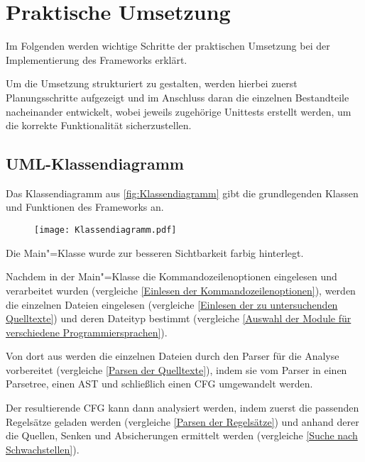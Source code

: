\chapter{Praktische Umsetzung}
    Im Folgenden werden wichtige Schritte der praktischen Umsetzung bei der Implementierung des Frameworks erklärt.

    Um die Umsetzung strukturiert zu gestalten,
    werden hierbei zuerst Planungsschritte aufgezeigt und
    im Anschluss daran die einzelnen Bestandteile nacheinander entwickelt,
    wobei jeweils zugehörige Unittests erstellt werden,
    um die korrekte Funktionalität sicherzustellen.

    \section{UML-Klassendiagramm}
        Das Klassendiagramm aus
        \vref{fig:Klassendiagramm} gibt die grundlegenden Klassen und
        Funktionen des Frameworks an.

        \begin{figure}[htp]
            \centering%
            \texttt{[image: Klassendiagramm.pdf]}
            \label{fig:Klassendiagramm}
        \end{figure}

        Die Main"=Klasse wurde zur besseren Sichtbarkeit farbig hinterlegt.

        Nachdem in der Main"=Klasse die Kommandozeilenoptionen eingelesen und
        verarbeitet wurden
        (vergleiche
        \vref{Einlesen der Kommandozeilenoptionen}),
        werden die einzelnen Dateien eingelesen
        (vergleiche
        \vref{Einlesen der zu untersuchenden Quelltexte}) und
        deren Dateityp bestimmt
        (vergleiche
        \vref{Auswahl der Module für verschiedene Programmiersprachen}).

        Von dort aus werden die einzelnen Dateien durch den Parser für die Analyse vorbereitet
        (vergleiche
        \vref{Parsen der Quelltexte}),
        indem sie vom Parser in einen Parsetree,
        einen
        \gls{AST} und
        schließlich einen
        \gls{CFG} umgewandelt werden.

        Der resultierende
        \gls{CFG} kann dann analysiert werden,
        indem zuerst die passenden Regelsätze geladen werden
        (vergleiche
        \vref{Parsen der Regelsätze}) und
        anhand derer die Quellen,
        Senken und
        Absicherungen ermittelt werden
        (vergleiche
        \vref{Suche nach Schwachstellen}).

